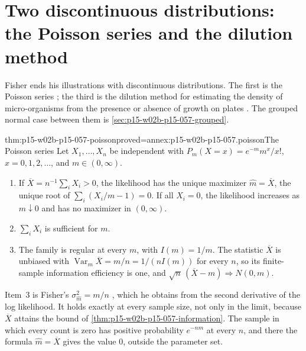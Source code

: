 \section{Two discontinuous distributions: the Poisson series and the dilution method}
\label{sec:p15-w02b-p15-057-discrete}

Fisher ends his illustrations with discontinuous distributions. The first
is the Poisson series \cite[p.~359]{Fisher1922Foundations}; the third is the
dilution method for estimating the density of micro-organisms from the
presence or absence of growth on plates
\cite[pp.~363--366]{Fisher1922Foundations}. The grouped normal case between
them is \cref{sec:p15-w02b-p15-057-grouped}.

\begin{hbtheorem}{thm:p15-w02b-p15-057-poisson}{proved=annex:p15-w02b-p15-057.poisson}{The Poisson series}
Let \(X_1,\ldots,X_n\) be independent with
\(P_m(X=x)=e^{-m}m^x/x!\), \(x=0,1,2,\ldots\), and \(m\in(0,\infty)\).
\begin{enumerate}
\item If \(\overline X=n^{-1}\sum_iX_i>0\), the likelihood has the unique
 maximizer \(\widehat m=\overline X\), the unique root of
 \(\sum_i(X_i/m-1)=0\). If all \(X_i=0\), the likelihood increases as
 \(m\downarrow0\) and has no maximizer in \((0,\infty)\).
\item \(\sum_iX_i\) is sufficient for \(m\).
\item The family is regular at every \(m\), with \(I(m)=1/m\). The
 statistic \(\overline X\) is unbiased with
 \(\operatorname{Var}_m\overline X=m/n=1/(nI(m))\) for every \(n\), so its
 finite-sample information efficiency is one, and
 \(\sqrt n\,(\overline X-m)\Rightarrow N(0,m)\).
\end{enumerate}
\end{hbtheorem}

Item~3 is Fisher's \(\sigma_{\hat m}^2=m/n\)
\cite[p.~359]{Fisher1922Foundations}, which he obtains from the second
derivative of the log likelihood. It holds exactly at every sample size,
not only in the limit, because \(\overline X\) attains the bound of
\cref{thm:p15-w02b-p15-057-information}. The sample in which every count is
zero has positive probability \(e^{-nm}\) at every \(n\), and there the
formula \(\widehat m=\overline X\) gives the value \(0\), outside the
parameter set.

